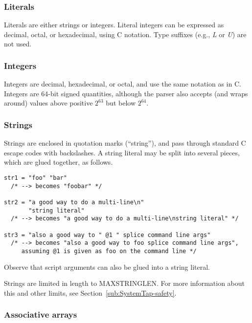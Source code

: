 \documentclass[twoside,english]{article}
\newenvironment{vindent}
{\begin{list}{}{\setlength{\listparindent}{6pt}}
\item[]}
{\end{list}}
\begin{document}
\subsubsection{Literals}
Literals are either strings or integers.
Literal integers can be expressed as decimal,
octal, or hexadecimal, using C notation. Type suffixes (e.g., \emph{L} or
\emph{U}) are not used.


\subsubsection{Integers\label{sub:Integers}}
 
Integers are decimal, hexadecimal, or octal, and use the same notation as
in C. Integers are 64-bit signed quantities, although the parser also accepts
(and wraps around) values above positive $2^{63}$ but below $2^{64}$.


\subsubsection{Strings\label{sub:Strings}}

Strings are enclosed in quotation marks ({}``string''), and pass
through standard C escape codes with backslashes. A string literal may
be split into several pieces, which are glued together, as follows.

\begin{vindent}
\begin{verbatim}
str1 = "foo" "bar"
  /* --> becomes "foobar" */

str2 = "a good way to do a multi-line\n"
       "string literal"
  /* --> becomes "a good way to do a multi-line\nstring literal" */

str3 = "also a good way to " @1 " splice command line args"
  /* --> becomes "also a good way to foo splice command line args",
     assuming @1 is given as foo on the command line */
\end{verbatim}
\end{vindent}

Observe that script arguments can also be glued into a string literal.

Strings are limited in length to MAXSTRINGLEN. For more information
about this and other limits, see Section~\ref{sub:SystemTap-safety}.


\subsubsection{Associative arrays}
\end{document}
